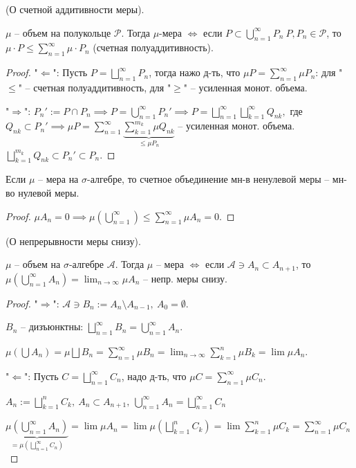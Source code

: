 \begin{theorem}
    (О счетной аддитивности меры).
    
    $\mu$ -- объем на полукольце $\mathcal{P}$. Тогда $\mu$-мера $\Leftrightarrow$ если $P \subset \bigcup_{n=1}^{\infty}P_n \ P, P_n \in \mathcal{P}$, то $\mu \cdot P \leq \sum_{n=1}^{\infty}\mu \cdot P_n$ (счетная полуаддитивность). 
\end{theorem}
\begin{proof}
    "$\Leftarrow$": Пусть $P=\bigsqcup_{n=1}^{\infty} P_n$, тогда нажо д-ть, что $\mu P = \sum_{n=1}^{\infty} \mu P_n$: для "$\leq$" -- счетная полуаддитивность, для "$\geq$" -- усиленная монот. объема.

    "$\Rightarrow$": $P_n' := P \cap P_n \implies P = \bigcup_{n=1}^{\infty}P_n' \implies P = \bigsqcup_{n=1}^{\infty} \bigsqcup_{k=1}^{\infty} Q_{nk}, $ где $Q_{nk} \subset P_n' \implies \mu P = \sum_{n=1}^{\infty} \underbrace{\sum_{k=1}^{m_k} \mu Q_{nk}}_{\leq \mu P_n}$ -- усиленная монот. объема. $\bigsqcup_{k=1}^{m_k} Q_{nk} \subset P_n' \subset P_n$.
\end{proof}

\begin{consequence}
    Если $\mu$ -- мера на $\sigma$-алгебре, то счетное объединение мн-в ненулевой меры -- мн-во нулевой меры.
\end{consequence}
\begin{proof}
    $\mu A_n = 0 \implies \mu \left( \bigcup_{n=1}^{\infty} \right) \leq \sum_{n=1}^{\infty} \mu A_n = 0$.
\end{proof}

\begin{theorem}
    (О непрерывности меры снизу).

    $\mu$ -- объем на $\sigma$-алгебре $\mathcal{A}$. Тогда $\mu$ -- мера $\Leftrightarrow$ если $\mathcal{A} \ni A_n \subset A_{n+1}$, то $\mu \left( \bigcup_{n=1}^{\infty} A_n \right) = \lim_{n \rightarrow \infty }{\mu A_n}$ -- непр. меры снизу. 
\end{theorem}
\begin{proof}
    "$\Rightarrow$": $\mathcal{A} \ni B_n := A_n \setminus A_{n-1}, \ A_0 = \emptyset$.

    $B_n$ -- дизъюнктны: $\bigsqcup_{n=1}^{\infty} B_n = \bigcup_{n=1}^{\infty} A_n$.

    $\mu \left( \bigcup A_n \right) = \mu \bigsqcup B_n = \sum_{n=1}^{\infty}\mu B_n = \lim_{n \rightarrow \infty} \sum_{k=1}^{n} \mu B_k = \lim \mu A_n$.

    "$\Leftarrow$": Пусть $C = \bigsqcup_{n=1}^{\infty} C_n$, надо д-ть, что $\mu C = \sum_{n=1}^{\infty} \mu C_n$.

    $A_n := \bigsqcup_{k=1}^{n} C_k, \ A_n \subset A_{n+1}, \ \bigcup_{n=1}^{\infty} A_n = \bigsqcup_{n=1}^{\infty} C_n$

    $\underbrace{\mu \left( \bigcup_{n=1}^{\infty} A_n\right)}_{= \mu \left( \bigsqcup_{n=1}^{\infty} C_n\right)} = \lim \mu A_n = \lim \mu \left( \bigsqcup_{k=1}^{n} C_k\right)  = \lim \sum_{k=1}^{n} \mu C_k = \sum_{n=1}^{\infty} \mu C_n$
\end{proof}

